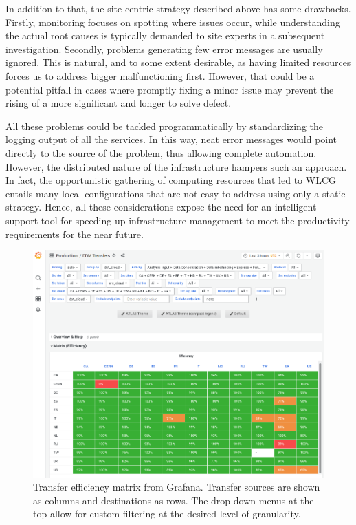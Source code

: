 In addition to that, the site-centric strategy described above has some drawbacks. Firstly, monitoring focuses on spotting where issues occur, while understanding the actual root causes is typically demanded to site experts in a subsequent investigation.
Secondly, problems generating few error messages are usually ignored. This is natural, and to some extent desirable, as having limited resources forces us to address bigger malfunctioning first. However, that could be a potential pitfall in cases where promptly fixing a minor issue may prevent the rising of a more significant and longer to solve defect.

All these problems could be tackled programmatically by standardizing the logging output of all the services. In this way, neat error messages would point directly to the source of the problem, thus allowing complete automation. 
However, the distributed nature of the infrastructure hampers such an approach.
In fact, the opportunistic gathering of computing resources that led to WLCG entails many local configurations that are not easy to address using only a static strategy.
Hence, all these considerations expose the need for an intelligent support tool for speeding up infrastructure management to meet the productivity requirements for the near future.

\begin{landscape}
\begin{figure}
    \centering
    \includegraphics[height=\textwidth]{figures/220_introduction/grafana_efficiency_matrix_narrow1.png}
    \caption{Transfer efficiency matrix from Grafana. Transfer sources are shown as columns and destinations as rows. The drop-down menus at the top allow for custom filtering at the desired level of granularity.}
    \label{fig:efficiency_matrix}
\end{figure}
\end{landscape}